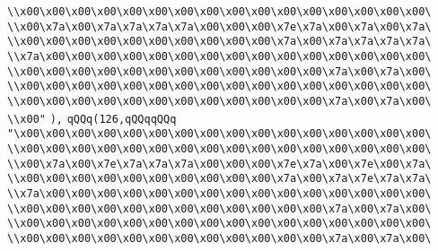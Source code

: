 \verb|\\x00\x00\x00\x00\x00\x00\x00\x00\x00\x00\x00\x00\x00\x00\x00\x00\|\newline
\verb|\\x00\x7a\x00\x7a\x7a\x7a\x7a\x00\x00\x00\x7e\x7a\x00\x7a\x00\x7a\|\newline
\verb|\\x00\x00\x00\x00\x00\x00\x00\x00\x00\x00\x7a\x00\x7a\x7a\x7a\x7a\|\newline
\verb|\\x7a\x00\x00\x00\x00\x00\x00\x00\x00\x00\x00\x00\x00\x00\x00\x00\|\newline
\verb|\\x00\x00\x00\x00\x00\x00\x00\x00\x00\x00\x00\x00\x7a\x00\x7a\x00\|\newline
\verb|\\x00\x00\x00\x00\x00\x00\x00\x00\x00\x00\x00\x00\x00\x00\x00\x00\|\newline
\verb|\\x00\x00\x00\x00\x00\x00\x00\x00\x00\x00\x00\x00\x7a\x00\x7a\x00\|\newline
\verb|\\x00"|\newline
\verb|),|\newline
\verb|qQQq(126,qQQqqQQq|\newline
\verb|"\x00\x00\x00\x00\x00\x00\x00\x00\x00\x00\x00\x00\x00\x00\x00\x00\|\newline
\verb|\\x00\x00\x00\x00\x00\x00\x00\x00\x00\x00\x00\x00\x00\x00\x00\x00\|\newline
\verb|\\x00\x7a\x00\x7e\x7a\x7a\x7a\x00\x00\x00\x7e\x7a\x00\x7e\x00\x7a\|\newline
\verb|\\x00\x00\x00\x00\x00\x00\x00\x00\x00\x00\x7a\x00\x7a\x7e\x7a\x7a\|\newline
\verb|\\x7a\x00\x00\x00\x00\x00\x00\x00\x00\x00\x00\x00\x00\x00\x00\x00\|\newline
\verb|\\x00\x00\x00\x00\x00\x00\x00\x00\x00\x00\x00\x00\x7a\x00\x7a\x00\|\newline
\verb|\\x00\x00\x00\x00\x00\x00\x00\x00\x00\x00\x00\x00\x00\x00\x00\x00\|\newline
\verb|\\x00\x00\x00\x00\x00\x00\x00\x00\x00\x00\x00\x00\x7a\x00\x7a\x00\|\newline
